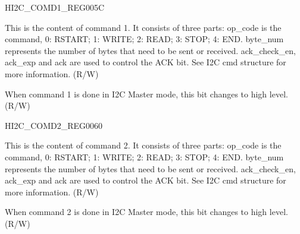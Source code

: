 \begin{register}{H}{I2C\_COMD1\_REG}{\hexprefix{}005C}\label{regdesc:I2CCOMD1REG}
%
%
%
\regnewline%
\begin{regdesc}\begin{reglist}
\label{fielddesc:I2CCOMMAND1}\item [I2C\_COMMAND1] This is the content of command 1. It consists of three parts:
op\_code is the command, 0: RSTART; 1: WRITE; 2: READ; 3: STOP; 4: END.
byte\_num represents the number of bytes that need to be sent or received.
ack\_check\_en, ack\_exp and ack are used to control the ACK bit. See I2C cmd structure for more information. (R/W)
\label{fielddesc:I2CCOMMAND1DONE}\item [I2C\_COMMAND1\_DONE] When command 1 is done in I2C Master mode, this bit changes to high level. (R/W)
\end{reglist}\end{regdesc}
\end{register}


\begin{register}{H}{I2C\_COMD2\_REG}{\hexprefix{}0060}\label{regdesc:I2CCOMD2REG}
%
%
%
\regnewline%
\begin{regdesc}\begin{reglist}
\label{fielddesc:I2CCOMMAND2}\item [I2C\_COMMAND2] This is the content of command 2. It consists of three parts:
op\_code is the command, 0: RSTART; 1: WRITE; 2: READ; 3: STOP; 4: END.
byte\_num represents the number of bytes that need to be sent or received.
ack\_check\_en, ack\_exp and ack are used to control the ACK bit. See I2C cmd structure for more information. (R/W)
\label{fielddesc:I2CCOMMAND2DONE}\item [I2C\_COMMAND2\_DONE] When command 2 is done in I2C Master mode, this bit changes to high level. (R/W)
\end{reglist}\end{regdesc}
\end{register}


